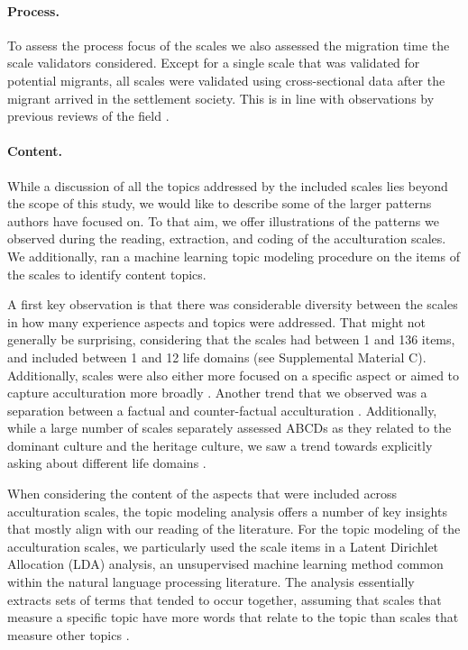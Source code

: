 \paragraph{Process.}

To assess the process focus of the scales we also assessed the migration
time the scale validators considered. Except for a single scale that was
validated for potential migrants, all scales were validated using
cross-sectional data after the migrant arrived in the settlement
society. This is in line with observations by previous reviews of the
field \citep[e.g.,][]{Brown2011}.

\color{blue}
\paragraph{Content.}

While a discussion of all the topics addressed by the included scales
lies beyond the scope of this study, we would like to describe some of
the larger patterns authors have focused on. To that aim, we offer
illustrations of the patterns we observed during the reading,
extraction, and coding of the acculturation scales. We additionally, ran
a machine learning topic modeling procedure on the items of the scales
to identify content topics.

A first key observation is that there was considerable diversity between
the scales in how many experience aspects and topics were addressed.
That might not generally be surprising, considering that the scales had
between 1 and 136 items, and included between 1 and 12 life domains (see
Supplemental Material C). Additionally, scales were also either more
focused on a specific aspect
\citep[e.g., `Asian Value Scale';][]{Kim1999, Kim2004a} or aimed to
capture acculturation more broadly
\citep[e.g., `Asian American Multidimensional Acculturation Scale'][]{GimChung2004}.
Another trend that we observed was a separation between a factual and
counter-factual acculturation
\citep[e.g., real vs. ideal][]{Navas2005, Navas2007, BenetMartinez2006}.
Additionally, while a large number of scales separately assessed ABCDs
as they related to the dominant culture and the heritage culture, we saw
a trend towards explicitly asking about different life domains
\citep[e.g., family, work, media;][also see Supplemental Material C]{Kim2010a, Arends-Toth2007, Mancini2014}.

When considering the content of the aspects that were included across
acculturation scales, the topic modeling analysis offers a number of key
insights that mostly align with our reading of the literature. For the
topic modeling of the acculturation scales, we particularly used the
scale items in a Latent Dirichlet Allocation (LDA) analysis, an
unsupervised machine learning method common within the natural language
processing literature. The analysis essentially extracts sets of terms
that tended to occur together, assuming that scales that measure a
specific topic have more words that relate to the topic than scales that
measure other topics
\citep[we followed the procedures outlined by][for a full methodological detail see Supplemental Material B]{Schweinberger2022}.

